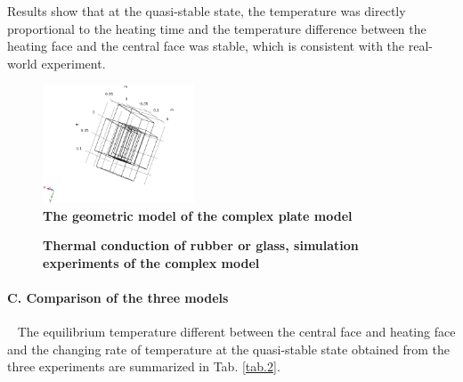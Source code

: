 \documentclass[10pt,a4paper,twocolumn,twoside,UTF8]{article}
\begin{document}
	Results show that at the quasi-stable state, the temperature was directly proportional to the heating time and the temperature difference between the heating face and the central face was stable, which is consistent with the real-world experiment.

	\begin{figure}[htbp]
		\centering
		\includegraphics[width=0.4\textwidth]{attachments/fig.2.3.0.png}
		\caption{\textbf{The geometric model of the complex plate model}}
		\label{fig.2.3.0}
	\end{figure}
	
	\begin{figure}[htbp]
		\centering
		\caption{\textbf{Thermal conduction of rubber or glass, simulation experiments of the complex model}}
		\label{fig.2.3}
	\end{figure}


	\paragraph{C. Comparison of the three models}~
	The equilibrium temperature different between the central face and heating face and the changing rate of temperature at the quasi-stable state obtained from the three experiments are summarized in Tab. \ref{tab.2}.
	
\end{document}
